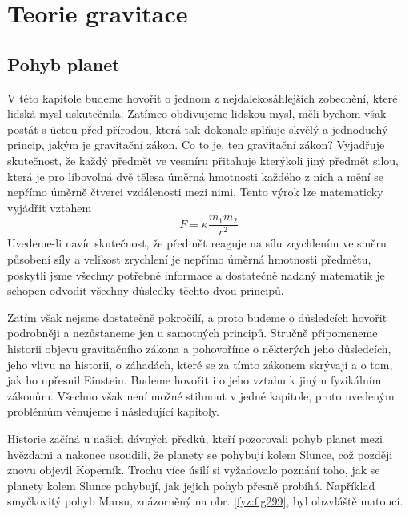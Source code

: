 \chapter{Teorie gravitace}\label{fyz:chap_fey_gravity}
\minitoc
  \section{Pohyb planet}
    V této kapitole budeme hovořit o jednom z nejdalekosáhlejších zobecnění, které lidská mysl 
    uskutečnila. Zatímco obdivujeme lidskou mysl, měli bychom však postát s úctou před přírodou, 
    která tak dokonale splňuje skvělý a jednoduchý princip, jakým je gravitační zákon. Co to je, 
    ten gravitační zákon? Vyjadřuje skutečnost, že každý předmět ve vesmíru přitahuje kterýkoli 
    jiný předmět silou, která je pro libovolná dvě tělesa úměrná hmotnosti každého z nich a mění se 
    nepřímo úměrně čtverci vzdálenosti mezi nimi. Tento výrok lze matematicky vyjádřit vztahem
    \begin{equation}\label{FYZ:eq096}
      F = \kappa\frac{m_1m_2}{r^2}
    \end{equation}
    Uvedeme-li navíc skutečnost, že předmět reaguje na sílu zrychlením ve směru působení síly a 
    velikost zrychlení je nepřímo úměrná hmotnosti předmětu, poskytli jsme všechny potřebné 
    informace a dostatečně nadaný matematik je schopen odvodit všechny důsledky těchto dvou 
    principů.
    
    Zatím však nejsme dostatečně pokročilí, a proto budeme o důsledcích hovořit podrobněji a 
    nezůstaneme jen u samotných principů. Stručně připomeneme historii objevu gravitačního zákona a 
    pohovoříme o některých jeho důsledcích, jeho vlivu na historii, o záhadách, které se za tímto 
    zákonem skrývají a o tom, jak ho upřesnil Einstein. Budeme hovořit i o jeho vztahu k jiným 
    fyzikálním zákonům. Všechno však není možné stihnout v jedné kapitole, proto uvedeným problémům 
    věnujeme i následující kapitoly.
    
    Historie začíná u našich dávných předků, kteří pozorovali pohyb planet mezi hvězdami a nakonec 
    usoudili, že planety se pohybují kolem Slunce, což později znovu objevil Koperník. Trochu více 
    úsilí si vyžadovalo poznání toho, jak se planety kolem Slunce pohybují, jak jejich pohyb přesně 
    probíhá. Například smyčkovitý pohyb Marsu, znázorněný na obr. \ref{fyz:fig299}, byl obzvláště 
    matoucí.
    
